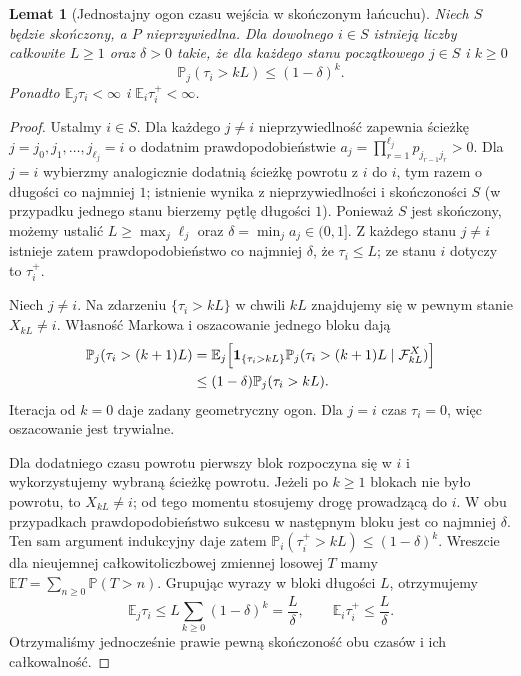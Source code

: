 \documentclass[11pt,a4paper,oneside]{report}
\numberwithin{equation}{chapter}
\theoremstyle{plain}
\newtheorem{lemat}[twierdzenie]{Lemat}
\theoremstyle{definition}
\theoremstyle{remark}
\newcommand{\Prob}{\mathbb{P}}
\newcommand{\E}{\mathbb{E}}
\newcommand{\ind}[1]{\mathbf{1}_{#1}}
\begin{document}
\begin{lemat}[Jednostajny ogon czasu wejścia w skończonym łańcuchu]
Niech $S$ będzie skończony, a $P$ nieprzywiedlna.
Dla dowolnego $i\in S$ istnieją liczby całkowite
$L\geq1$ oraz $\delta>0$ takie, że dla każdego
stanu początkowego $j\in S$ i $k\geq0$
\[
\Prob_j(\tau_i>kL)\leq(1-\delta)^k.
\]
Ponadto $\E_j\tau_i<\infty$ i
$\E_i\tau_i^+<\infty$.
\end{lemat}
\begin{proof}
Ustalmy $i\in S$. Dla każdego $j\neq i$
nieprzywiedlność zapewnia ścieżkę
$j=j_0,j_1,\ldots,j_{\ell_j}=i$ o dodatnim
prawdopodobieństwie
$a_j=\prod_{r=1}^{\ell_j}p_{j_{r-1}j_r}>0$.
Dla $j=i$ wybierzmy analogicznie dodatnią
ścieżkę powrotu z $i$ do $i$, tym razem o
długości co najmniej $1$; istnienie wynika z
nieprzywiedlności i skończoności $S$
(w przypadku jednego stanu bierzemy pętlę długości $1$).
Ponieważ $S$ jest skończony, możemy ustalić
$L\geq\max_j\ell_j$ oraz
$\delta=\min_j a_j\in(0,1]$.
Z każdego stanu $j\neq i$ istnieje zatem
prawdopodobieństwo co najmniej $\delta$, że
$\tau_i\leq L$; ze stanu $i$ dotyczy to
$\tau_i^+$.

Niech $j\neq i$. Na zdarzeniu $\{\tau_i>kL\}$
w chwili $kL$ znajdujemy się w pewnym stanie
$X_{kL}\neq i$. Własność Markowa i oszacowanie
jednego bloku dają
\begin{align*}
\Prob_j(\tau_i>(k+1)L)
&=\E_j\Bigl[\ind{\{\tau_i>kL\}}
  \Prob_j(\tau_i>(k+1)L\mid\mathcal F_{kL}^X)\Bigr]\\
&\leq(1-\delta)\Prob_j(\tau_i>kL).
\end{align*}
Iteracja od $k=0$ daje zadany geometryczny ogon.
Dla $j=i$ czas $\tau_i=0$, więc oszacowanie
jest trywialne.

Dla dodatniego czasu powrotu pierwszy blok
rozpoczyna się w $i$ i wykorzystujemy wybraną
ścieżkę powrotu. Jeżeli po $k\geq1$ blokach
nie było powrotu, to $X_{kL}\neq i$; od tego
momentu stosujemy drogę prowadzącą do $i$.
W obu przypadkach prawdopodobieństwo sukcesu
w następnym bloku jest co najmniej $\delta$.
Ten sam argument indukcyjny daje zatem
$\Prob_i(\tau_i^+>kL)\leq(1-\delta)^k$.
Wreszcie dla nieujemnej całkowitoliczbowej zmiennej
losowej $T$ mamy $\E T=\sum_{n\geq0}\Prob(T>n)$.
Grupując wyrazy w bloki długości $L$, otrzymujemy
\[
\E_j\tau_i\leq L\sum_{k\geq0}(1-\delta)^k
=\frac L\delta,
\qquad
\E_i\tau_i^+\leq\frac L\delta.
\]
Otrzymaliśmy jednocześnie prawie pewną skończoność
obu czasów i ich całkowalność.
\end{proof}
\end{document}
